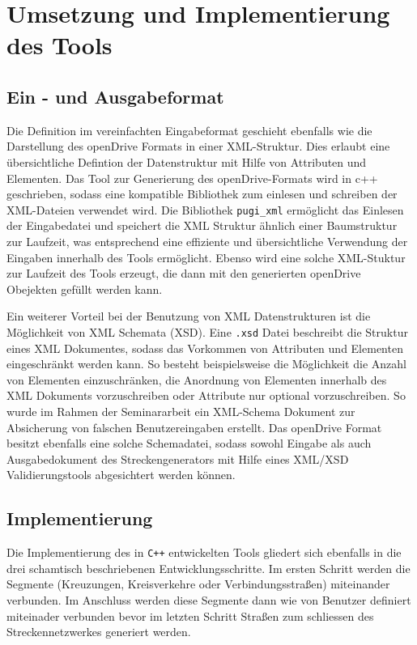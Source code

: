 \chapter{Umsetzung und Implementierung des Tools}

\section{Ein - und Ausgabeformat}
Die Definition im vereinfachten Eingabeformat geschieht ebenfalls wie die Darstellung des openDrive Formats in einer XML-Struktur. Dies erlaubt eine übersichtliche Defintion der Datenstruktur mit Hilfe von Attributen und Elementen. Das Tool zur Generierung des openDrive-Formats wird in c++ geschrieben, sodass eine kompatible Bibliothek zum einlesen und schreiben der XML-Dateien verwendet wird. Die Bibliothek \texttt{pugi\_xml} ermöglicht das Einlesen der Eingabedatei und speichert die XML Struktur ähnlich einer Baumstruktur zur Laufzeit, was entsprechend eine effiziente und übersichtliche Verwendung der Eingaben innerhalb des Tools ermöglicht. Ebenso wird eine solche XML-Stuktur zur Laufzeit des Tools erzeugt, die dann mit den generierten openDrive Obejekten gefüllt werden kann. 

Ein weiterer Vorteil bei der Benutzung von XML Datenstrukturen ist die Möglichkeit von XML Schemata (XSD). Eine \texttt{.xsd} Datei beschreibt die Struktur eines XML Dokumentes, sodass das Vorkommen von Attributen und Elementen eingeschränkt werden kann. So besteht beispielsweise die Möglichkeit die Anzahl von Elementen einzuschränken, die Anordnung von Elementen innerhalb des XML Dokuments vorzuschreiben oder Attribute nur optional vorzuschreiben. So wurde im Rahmen der Seminararbeit ein XML-Schema Dokument zur Absicherung von falschen Benutzereingaben erstellt. Das openDrive Format besitzt ebenfalls eine solche Schemadatei, sodass sowohl Eingabe als auch Ausgabedokument des Streckengenerators mit Hilfe eines XML/XSD Validierungstools abgesichtert werden können.
 
\section{Implementierung}
Die Implementierung des in \texttt{C++} entwickelten Tools gliedert sich ebenfalls in die drei schamtisch beschriebenen Entwicklungsschritte. Im ersten Schritt werden die Segmente (Kreuzungen, Kreisverkehre oder Verbindungsstraßen) miteinander verbunden. Im Anschluss werden diese Segmente dann wie von Benutzer definiert miteinader verbunden bevor im letzten Schritt Straßen zum schliessen des Streckennetzwerkes generiert werden.

